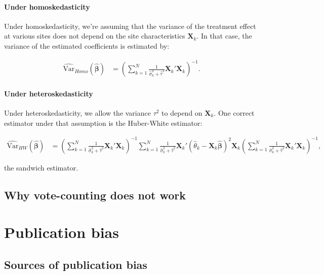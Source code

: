 \documentclass[]{book}
\let\oldparagraph\paragraph
\renewcommand{\paragraph}[1]{\oldparagraph{#1}\mbox{}}
\theoremstyle{definition}
\theoremstyle{definition}
\theoremstyle{definition}
\theoremstyle{remark}
\begin{document}
\paragraph{Under homoskedasticity}\label{under-homoskedasticity}

Under homoskedasticity, we're assuming that the variance of the
treatment effect at various sites does not depend on the site
characteristics \(\mathbf{X}_k\). In that case, the variance of the
estimated coefficients is estimated by:

\begin{align*}
\hat{\text{Var}}_{Homo}(\hat{\mathbf{\beta}}) & = \left(\sum_{k=1}^N\frac{1}{\hat{\sigma}^2_k+\hat{\tau}^2}\mathbf{X}_k'\mathbf{X}_k\right)^{-1}.
\end{align*}

\paragraph{Under heteroskedasticity}\label{under-heteroskedasticity}

Under heteroskedasticity, we allow the variance \(\tau^2\) to depend on
\(\mathbf{X}_k\). One correct estimator under that assumption is the
Huber-White estimator:

\begin{align*}
\hat{\text{Var}}_{HW}(\hat{\mathbf{\beta}}) & = \left(\sum_{k=1}^N\frac{1}{\hat{\sigma}^2_k+\hat{\tau}^2}\mathbf{X}_k'\mathbf{X}_k\right)^{-1}
                                                  \sum_{k=1}^N\frac{1}{\hat{\sigma}^2_k+\hat{\tau}^2}\mathbf{X}_k'(\hat{\theta}_k-\mathbf{X}_k\hat{\mathbf{\beta}})^2\mathbf{X}_k
                                                  \left(\sum_{k=1}^N\frac{1}{\hat{\sigma}^2_k+\hat{\tau}^2}\mathbf{X}_k'\mathbf{X}_k\right)^{-1},
\end{align*}

the sandwich estimator.

\subsection{Why vote-counting does not
work}\label{why-vote-counting-does-not-work}

\section{Publication bias}\label{publication-bias-1}

\subsection{Sources of publication
bias}\label{sources-of-publication-bias}
\end{document}
